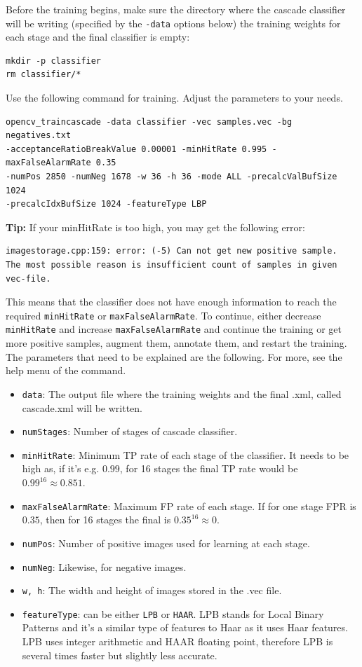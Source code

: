 \documentclass[a4paper]{article}
\begin{document}
Before the training begins, make sure the directory where the cascade classifier  will be writing (specified by the \texttt{-data} options below) the training weights for each stage and the final classifier is empty:
\begin{lstlisting}[style=terminal]
mkdir -p classifier
rm classifier/*
\end{lstlisting}
Use the following command for training. Adjust the parameters to your needs.
\begin{lstlisting}[style=terminal]
opencv_traincascade -data classifier -vec samples.vec -bg negatives.txt
-acceptanceRatioBreakValue 0.00001 -minHitRate 0.995 -maxFalseAlarmRate 0.35 
-numPos 2850 -numNeg 1678 -w 36 -h 36 -mode ALL -precalcValBufSize 1024
-precalcIdxBufSize 1024 -featureType LBP
\end{lstlisting}



\textbf{Tip:} If your minHitRate is too high, you may get the following error:
\begin{verbatim}
imagestorage.cpp:159: error: (-5) Can not get new positive sample.
The most possible reason is insufficient count of samples in given vec-file. 
\end{verbatim}
This means that the classifier does not have enough information to reach the required \texttt{minHitRate} or \texttt{maxFalseAlarmRate}. To continue, either decrease \texttt{minHitRate} and increase \texttt{maxFalseAlarmRate} and continue the training or get more positive samples, augment them, annotate them, and restart the training.
The parameters that need to be explained are the following. For more, see the help menu of the command.
\begin{itemize}
    \item \texttt{data}: The output file where the training weights and the final .xml, called cascade.xml will be written.
    \item \texttt{numStages}: Number of stages of cascade classifier.
    \item \texttt{minHitRate}: Minimum TP rate of each stage of the classifier. It needs to be high as, if it's e.g. $0.99$, for 16 stages the final TP rate would be $0.99^{16} \approx 0.851$. 
    \item \texttt{maxFalseAlarmRate}: Maximum FP rate of each stage. If for one stage FPR is $0.35$, then for 16 stages the final is $0.35^{16} \approx 0$.
    \item \texttt{numPos}: Number of positive images used for learning at each stage.
    \item \texttt{numNeg}: Likewise, for negative images.
    \item \texttt{w, h}: The width and height of images stored in the .vec file.
    \item \texttt{featureType}: can be either \texttt{LPB} or \texttt{HAAR}. LPB stands for Local Binary Patterns and it's a similar type of  features to Haar as it uses Haar features. LPB uses integer arithmetic and HAAR floating point, therefore LPB is several times faster but slightly less accurate.
\end{itemize}
\end{document}
